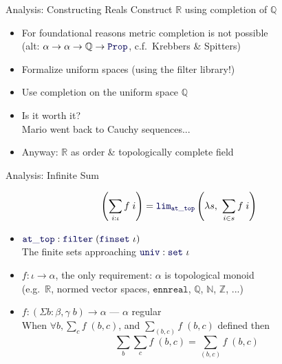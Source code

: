 \documentclass{beamer}
\newcommand{\ident}[1]{{\color{blue!33!black}\ensuremath{\mathtt{#1}}}}
\begin{document}
\begin{frame}{Analysis: Constructing Reals}
  Construct $\mathbb{R}$ using completion of $\mathbb{Q}$
  \begin{itemize}
    \item For foundational reasons metric completion is not possible \\
    \pause
      (alt: $\alpha \to \alpha \to \mathbb{Q} \to \ident{Prop}$, c.f.~Krebbers \& Spitters)
    \pause
    \item Formalize uniform spaces (using the filter library!)
    \pause
    \item Use completion on the uniform space $\mathbb{Q}$
    \pause
    \item Is it worth it? \\
    \pause
          Mario went back to Cauchy sequences...
    \pause
    \item Anyway: $\mathbb{R}$ as order \& topologically complete field
  \end{itemize}
\end{frame}

\begin{frame}{Analysis: Infinite Sum}

  \[ \left(\sum_{i:\iota} f\;i\right) = \ident{lim}_{\ident{at\_top}} \left(\lambda s,~\sum_{i \in s} f\;i\right) \]

  \begin{itemize}
    \item $\ident{at\_top} : \ident{filter}\;(\ident{finset}~\iota)$ \\
      The finite sets approaching $\ident{univ} : \ident{set}~\iota$
    \item $f : \iota \to \alpha$, the only requirement: $\alpha$ is topological monoid \\
      (e.g.~$\mathbb{R}$, normed vector spaces, \ident{ennreal}, $\mathbb{Q}$, $\mathbb{N}$, $\mathbb{Z}$, ...)
    \item $f : \left(\Sigma b : \beta, \gamma\;b\right) \to \alpha$ \qquad --- $\alpha$ regular \\
      When $\forall b, \sum_c f\;(b, c)$, and $\sum_{(b, c)} f\;(b, c)$ defined then \\
      \[ \sum_{b} \sum_{c} f\;(b, c) = \sum_{(b, c)} f\;(b, c) \]
  \end{itemize}

\end{frame}
\end{document}
